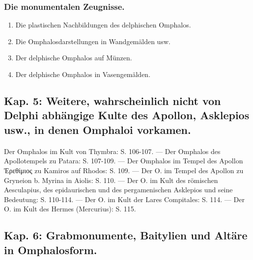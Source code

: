 \documentclass[a4paper, 11pt, oneside]{article}
\begin{document}
\subsubsection*{Die monumentalen Zeugnisse.}
\begin{enumerate}
    \item Die plastischen Nachbildungen des delphischen Omphalos.
    \item Die Omphalosdarstellungen in Wandgemälden usw.
    \item Der delphische Omphalos auf Münzen.
    \item Der delphische Omphalos in Vasengemälden.
\end{enumerate}
\subsection*{Kap. 5: Weitere, wahrscheinlich nicht von Delphi abhängige Kulte des Apollon, Asklepios usw., in denen Omphaloi vorkamen.}
\paragraph{}
Der Omphalos im Kult von Thymbra: S. 106-107. --- Der Omphalos des Apollotempels zu Patara: S. 107-109. --- Der Omphalos im Tempel des Apollon Ἐρεθίμιος zu Kamiros auf Rhodos: S. 109. --- Der O. im Tempel des Apollon zu Gryneion b. Myrina in Aiolis: S. 110. --- Der O. im Kult des römischen Aesculapius, des epidaurischen und des pergamenischen Asklepios und seine Bedeutung: S. 110-114. --- Der O. im Kult der Lares Compitales: S. 114. --- Der O. im Kult des Hermes (Mercurius): S. 115.

\subsection*{Kap. 6: Grabmonumente, Baitylien und Altäre in Omphalosform.}
\end{document}
